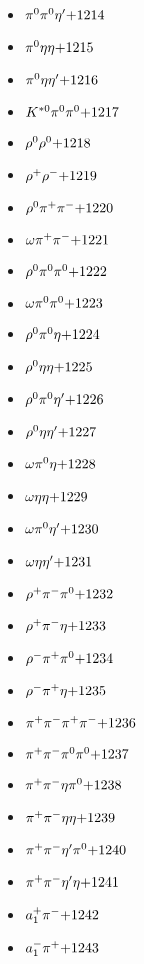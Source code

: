 \begin{multicols}{3}
\begin{itemize}
 \item $ \pi^{0} \pi^{0} {\eta^{\prime}} \hfill{+1214}$
 \item $ \pi^{0} \eta \eta \hfill{+1215}$
 \item $ \pi^{0} \eta {\eta^{\prime}} \hfill{+1216}$
 \item $ K^{*0} \pi^{0} \pi^{0} \hfill{+1217}$
 \item $ \rho^{0} \rho^{0} \hfill{+1218}$
 \item $ \rho^{+} \rho^{-} \hfill{+1219}$
 \item $ \rho^{0} \pi^{+} \pi^{-} \hfill{+1220}$
 \item $ \omega \pi^{+} \pi^{-} \hfill{+1221}$
 \item $ \rho^{0} \pi^{0} \pi^{0} \hfill{+1222}$
 \item $ \omega \pi^{0} \pi^{0} \hfill{+1223}$
 \item $ \rho^{0} \pi^{0} \eta \hfill{+1224}$
 \item $ \rho^{0} \eta \eta \hfill{+1225}$
 \item $ \rho^{0} \pi^{0} {\eta^{\prime}} \hfill{+1226}$
 \item $ \rho^{0} \eta {\eta^{\prime}} \hfill{+1227}$
 \item $ \omega \pi^{0} \eta \hfill{+1228}$
 \item $ \omega \eta \eta \hfill{+1229}$
 \item $ \omega \pi^{0} {\eta^{\prime}} \hfill{+1230}$
 \item $ \omega \eta {\eta^{\prime}} \hfill{+1231}$
 \item $ \rho^{+} \pi^{-} \pi^{0} \hfill{+1232}$
 \item $ \rho^{+} \pi^{-} \eta \hfill{+1233}$
 \item $ \rho^{-} \pi^{+} \pi^{0} \hfill{+1234}$
 \item $ \rho^{-} \pi^{+} \eta \hfill{+1235}$
 \item $ \pi^{+} \pi^{-} \pi^{+} \pi^{-} \hfill{+1236}$
 \item $ \pi^{+} \pi^{-} \pi^{0} \pi^{0} \hfill{+1237}$
 \item $ \pi^{+} \pi^{-} \eta \pi^{0} \hfill{+1238}$
 \item $ \pi^{+} \pi^{-} \eta \eta \hfill{+1239}$
 \item $ \pi^{+} \pi^{-} {\eta^{\prime}} \pi^{0} \hfill{+1240}$
 \item $ \pi^{+} \pi^{-} {\eta^{\prime}} \eta \hfill{+1241}$
 \item $ a_{1}^{+} \pi^{-} \hfill{+1242}$
 \item $ a_{1}^{-} \pi^{+} \hfill{+1243}$

\end{itemize}
\end{multicols}
